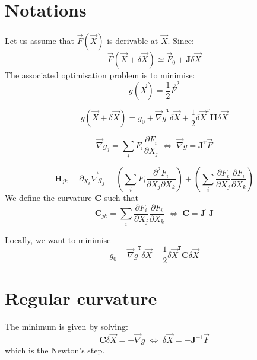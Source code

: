\documentclass[aps,12pt]{revtex4}
\newcommand{\trn}[1]{{#1}^{\mathtt{T}}}
\begin{document}
\section{Notations}

Let us assume that $\vec{F}(\vec{X})$ is derivable at $\vec{X}$.
Since:
\begin{equation}
	\vec{F}(\vec{X}+\delta\vec{X}) \simeq \vec{F}_0 + \bm{J} \delta\vec{X}
\end{equation}
The associated optimisation problem is to minimise:
\begin{equation}
	g(\vec{X}) = \dfrac{1}{2} \vec{F}^2
\end{equation}

\begin{equation}
	g(\vec{X}+\delta\vec{X}) = g_0 + \trn{\vec{\nabla}g} \delta\vec{X} + \dfrac{1}{2} \trn{\delta\vec{X}} \bm{H} \delta\vec{X}
\end{equation}

\begin{equation}
	\vec{\nabla}g_j = \sum_i F_i \dfrac{\partial F_i}{\partial X_j} \; \Leftrightarrow \; \vec{\nabla}g = \trn{\bm{J}} \vec{F}
\end{equation}

\begin{equation}
	\bm{H}_{jk} = \partial_{X_k} \vec{\nabla}g_j 
	= 
	\left( \sum_i F_i \dfrac{\partial^2 F_i}{\partial X_j \partial X_k} \right)
	+ \left( \sum_i \dfrac{\partial F_i}{\partial X_j} \dfrac{\partial F_i}{\partial X_k}\right)
\end{equation}
We define the curvature $\bm{C}$ such that
\begin{equation}
		\bm{C}_{jk} =   \sum_i \dfrac{\partial F_i}{\partial X_j} \dfrac{\partial F_i}{\partial X_k} \; \Leftrightarrow \;
		\bm{C} = \trn{\bm{J}}\bm{J}
\end{equation}

Locally, we want to minimise
\begin{equation}
	g_0 +  \trn{\vec{\nabla}g} \delta\vec{X} + \dfrac{1}{2} \trn{\delta\vec{X}} \bm{C} \delta\vec{X}
\end{equation}

\section{Regular curvature}
The minimum is given by solving:
\begin{equation}
\bm{C} \delta\vec{X} = -\vec{\nabla}g  \; \Leftrightarrow \;  \delta\vec{X} = - \bm{J}^{-1} \vec{F}
\end{equation}
which is the Newton's step.
\end{document}
